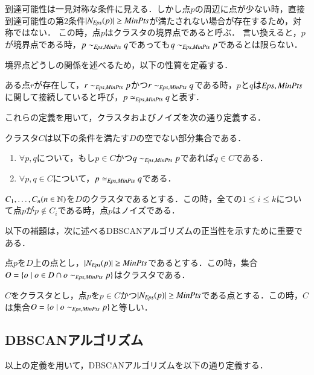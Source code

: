 到達可能性は一見対称な条件に見える．しかし点$p$の周辺に点が少ない時，直接到達可能性の第2条件$|N_{\it Eps}(p)| \geq {\it MinPts}$が満たされない場合が存在するため，対称ではない．
この時，点$p$はクラスタの境界点であると呼ぶ．
言い換えると，$p$が境界点である時，$p \sim_{{\it Eps}, {\it MinPts}} q$であっても$q \sim_{{\it Eps}, {\it MinPts}} p$であるとは限らない．

境界点どうしの関係を述べるため，以下の性質を定義する．

\begin{mathdef}[接続性]
ある点$r$が存在して，$r \sim_{{\it Eps}, {\it MinPts}} p$かつ$r \sim_{{\it Eps}, {\it MinPts}} q$である時，$p$と$q$は${\it Eps}, {\it MinPts}$に関して接続していると呼び，$p \simeq_{{\it Eps}, {\it MinPts}} q$と表す．
\end{mathdef}

これらの定義を用いて，クラスタおよびノイズを次の通り定義する．

\begin{mathdef}[クラスタ]
クラスタ$C$は以下の条件を満たす$D$の空でない部分集合である．

\begin{enumerate}
\item
$\forall p, q$について，もし$p \in C$かつ$q \sim_{{\it Eps}, {\it MinPts}} p$であれば$q \in C$である．
\item
$\forall p, q \in C$について，$p \simeq_{{\it Eps}, {\it MinPts}} q$である．
\end{enumerate}
\end{mathdef}

\begin{mathdef}[ノイズ]
$C_1, \dots, C_n (n \in \mathbb{N})$を$D$のクラスタであるとする．この時，全ての$1 \leq i \leq k$について点$p$が$p \not \in C_i$である時，点$p$はノイズである．
\end{mathdef}

以下の補題は，次に述べるDBSCANアルゴリズムの正当性を示すために重要である．

\begin{lemma}
点$p$を$D$上の点とし，$|N_{\it Eps}(p)| \geq {\it MinPts}$であるとする．この時，集合$O = \{o \mid o \in D \cap o \sim_{{\it Eps}, {\it MinPts}} p\}$はクラスタである．
\end{lemma}

\begin{lemma}
$C$をクラスタとし，点$p$を$p \in C$かつ$|N_{\it Eps}(p)| \geq {\it MinPts}$である点とする．この時，$C$は集合$O = \{o \mid o \sim_{{\it Eps}, {\it MinPts}} p\}$と等しい．
\end{lemma}

\subsection{DBSCANアルゴリズム}
以上の定義を用いて，DBSCANアルゴリズムを以下の通り定義する．

